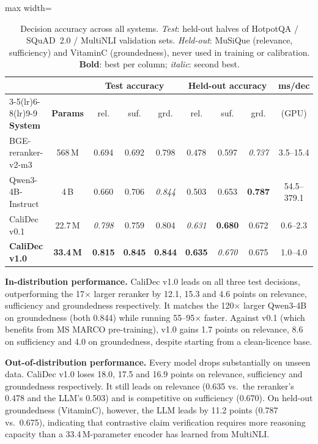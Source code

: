 \documentclass[twocolumn]{ICCKjournal}
\begin{document}
\begin{table}[t]
\caption{Decision accuracy across all systems. \emph{Test}: held-out halves of HotpotQA / SQuAD~2.0 / MultiNLI validation sets. \emph{Held-out}: MuSiQue (relevance, sufficiency) and VitaminC (groundedness), never used in training or calibration. \textbf{Bold}: best per column; \textit{italic}: second best.}
\label{tab:main}
\centering
\begin{adjustbox}{max width=\linewidth}
\begin{tabular}{lcccccccc}
\toprule
& & \multicolumn{3}{c}{\textbf{Test accuracy}} & \multicolumn{3}{c}{\textbf{Held-out accuracy}} & \textbf{ms/dec} \\
\cmidrule(lr){3-5}\cmidrule(lr){6-8}\cmidrule(lr){9-9}
\textbf{System} & \textbf{Params} & rel. & suf. & grd. & rel. & suf. & grd. & (GPU) \\
\midrule
BGE-reranker-v2-m3 & 568\,M & 0.694 & 0.692 & 0.798 & 0.478 & 0.597 & \textit{0.737} & 3.5--15.4 \\
Qwen3-4B-Instruct & 4\,B & 0.660 & 0.706 & \textit{0.844} & 0.503 & 0.653 & \textbf{0.787} & 54.5--379.1 \\
\midrule
CaliDec v0.1 & 22.7\,M & \textit{0.798} & 0.759 & 0.804 & \textit{0.631} & \textbf{0.680} & 0.672 & 0.6--2.3 \\
\textbf{CaliDec v1.0} & \textbf{33.4\,M} & \textbf{0.815} & \textbf{0.845} & \textbf{0.844} & \textbf{0.635} & \textit{0.670} & 0.675 & 1.0--4.0 \\
\bottomrule
\end{tabular}
\end{adjustbox}
\end{table}

\textbf{In-distribution performance.} CaliDec v1.0 leads on all three test decisions, outperforming the 17$\times$ larger reranker by 12.1, 15.3 and 4.6 points on relevance, sufficiency and groundedness respectively. It matches the 120$\times$ larger Qwen3-4B on groundedness (both 0.844) while running 55--95$\times$ faster. Against v0.1 (which benefits from MS MARCO pre-training), v1.0 gains 1.7 points on relevance, 8.6 on sufficiency and 4.0 on groundedness, despite starting from a clean-licence base.

\textbf{Out-of-distribution performance.} Every model drops substantially on unseen data. CaliDec v1.0 loses 18.0, 17.5 and 16.9 points on relevance, sufficiency and groundedness respectively. It still leads on relevance (0.635 vs.\ the reranker's 0.478 and the LLM's 0.503) and is competitive on sufficiency (0.670). On held-out groundedness (VitaminC), however, the LLM leads by 11.2 points (0.787 vs.\ 0.675), indicating that contrastive claim verification requires more reasoning capacity than a 33.4\,M-parameter encoder has learned from MultiNLI.
\end{document}
